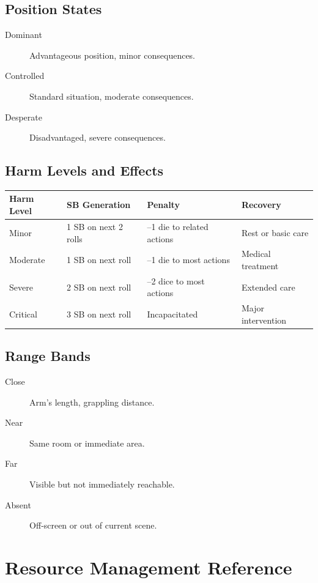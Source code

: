 \subsection{Position States}\label{subsec:position_ref}
\begin{description}
    \item[Dominant] Advantageous position, minor consequences.
    \item[Controlled] Standard situation, moderate consequences.
    \item[Desperate] Disadvantaged, severe consequences.
\end{description}

\subsection{Harm Levels and Effects}\label{subsec:harm_ref}
\begin{center}
\feTableStart
\begin{tabularx}{\linewidth}{@{}l l l l @{}}
\toprule
\textbf{Harm Level} & \textbf{SB Generation} & \textbf{Penalty} & \textbf{Recovery} \\
\midrule
Minor & 1 SB on next 2 rolls & --1 die to related actions & Rest or basic care \\
Moderate & 1 SB on next roll & --1 die to most actions & Medical treatment \\
Severe & 2 SB on next roll & --2 dice to most actions & Extended care \\
Critical & 3 SB on next roll & Incapacitated & Major intervention \\
\bottomrule
\end{tabularx}
\feTableEnd
\end{center}

\subsection{Range Bands}\label{subsec:range_bands_ref}
\begin{description}
    \item[Close] Arm's length, grappling distance.
    \item[Near] Same room or immediate area.
    \item[Far] Visible but not immediately reachable.
    \item[Absent] Off‑screen or out of current scene.
\end{description}

\newpage
\section{Resource Management Reference}\label{sec:resource_reference}

